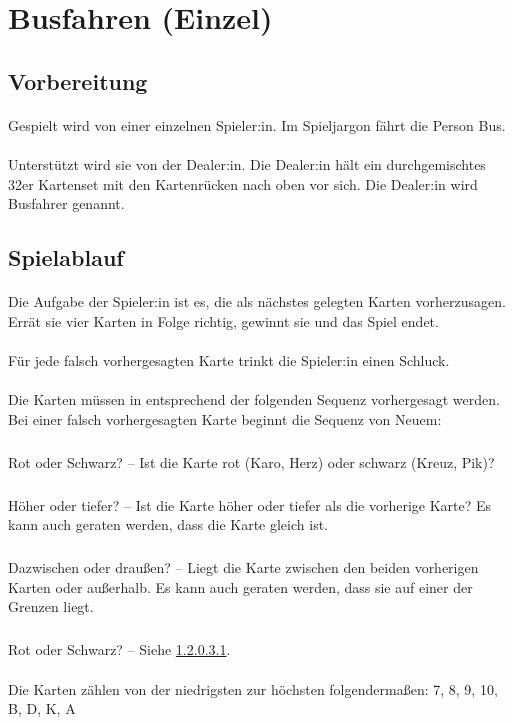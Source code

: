 \section{Busfahren (Einzel)} \label{Busfahren_solo}
\subsection{Vorbereitung}
\paragraph{}
Gespielt wird von einer einzelnen Spieler:in.
Im Spieljargon \glqq fährt die Person Bus\grqq{}.

\paragraph{}
Unterstützt wird sie von der Dealer:in.
Die Dealer:in hält ein durchgemischtes 32er Kartenset mit den Kartenrücken nach oben vor sich.
Die Dealer:in wird \glqq Busfahrer\grqq{} genannt.

\subsection{Spielablauf}
\paragraph{}
Die Aufgabe der Spieler:in ist es, die als nächstes gelegten Karten vorherzusagen.
Errät sie vier Karten in Folge richtig, gewinnt sie und das Spiel endet.

\paragraph{}
Für jede falsch vorhergesagten Karte trinkt die Spieler:in einen Schluck.

\paragraph{}
Die Karten müssen in entsprechend der folgenden Sequenz vorhergesagt werden.
Bei einer falsch vorhergesagten Karte beginnt die Sequenz von Neuem:
\subparagraph{} \label{Busfahren_solo:Spielablauf:Fragen:RS}
Rot oder Schwarz? – Ist die Karte rot (Karo, Herz) oder schwarz (Kreuz, Pik)?
\subparagraph{}
Höher oder tiefer? – Ist die Karte höher oder tiefer als die vorherige Karte?
Es kann auch geraten werden, dass die Karte gleich ist.
\subparagraph{}
Dazwischen oder draußen? – Liegt die Karte zwischen den beiden vorherigen Karten oder außerhalb.
Es kann auch geraten werden, dass sie auf einer der Grenzen liegt.
\subparagraph{}
Rot oder Schwarz? – Siehe \ref{Busfahren_solo:Spielablauf:Fragen:RS}.

\paragraph{}
Die Karten zählen von der niedrigsten zur höchsten folgendermaßen: 7, 8, 9, 10, B, D, K, A
